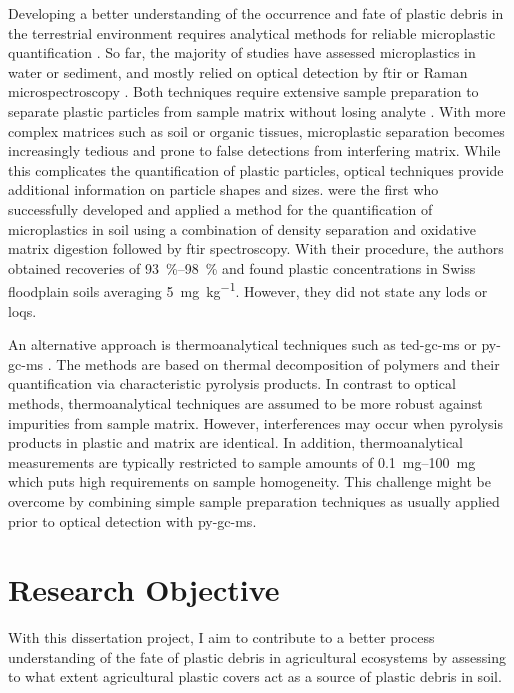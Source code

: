 \documentclass[justified,a4paper,
	nofonts,
	nobib
]{tufte-handout}
\begin{document}
Developing a better understanding of the occurrence and fate of plastic debris in the terrestrial environment requires analytical methods for reliable microplastic quantification \citep{BlasingPlastics2018,HeMicroplastics2018}.
So far, the majority of studies have assessed microplastics in water or sediment, and mostly relied on optical detection by \ac{ftir} or Raman microspectroscopy \citep{RennerAnalytical2018}. Both techniques require extensive sample preparation to separate plastic particles from sample matrix without losing analyte \citep{HurleyValidation2018}. With more complex matrices such as soil or organic tissues, microplastic separation becomes increasingly tedious and prone to false detections from interfering matrix. While this complicates the quantification of plastic particles, optical techniques provide additional information on particle shapes and sizes. \citet{ScheurerMicroplastics2018} were the first who successfully developed and applied a method for the quantification of microplastics in soil using a combination of density separation and oxidative matrix digestion followed by \ac{ftir} spectroscopy. With their procedure, the authors obtained recoveries of \SIrange{93}{98}{\percent} and found plastic concentrations in Swiss floodplain soils averaging \SI{5}{\milli\gram\per\kilogram}. However, they did not state any \acp{lod} or \acp{loq}.

An alternative approach is thermoanalytical techniques such as \ac{ted-gc-ms} \citep{DumichenFast2017} or \ac{py-gc-ms} \citep{FischerSimultaneous2017}. The methods are based on thermal decomposition of polymers and their quantification via characteristic pyrolysis products. In contrast to optical methods, thermoanalytical techniques are assumed to be more robust against impurities from sample matrix. However, interferences may occur when pyrolysis products in plastic and matrix are identical. In addition, thermoanalytical measurements are typically restricted to sample amounts of \SIrange{0.1}{100}{\milli\gram} which puts high requirements on sample homogeneity. This challenge might be overcome by combining simple sample preparation techniques as usually applied prior to optical detection with \ac{py-gc-ms}.

\section{Research Objective}\label{sec:objective}

With this dissertation project, I aim to contribute to a better process understanding of the fate of plastic debris in agricultural ecosystems by assessing to what extent agricultural plastic covers act as a source of plastic debris in soil.
\end{document}
